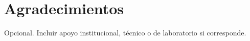 \section*{Agradecimientos}

Opcional. Incluir apoyo institucional, técnico o de laboratorio si corresponde.

